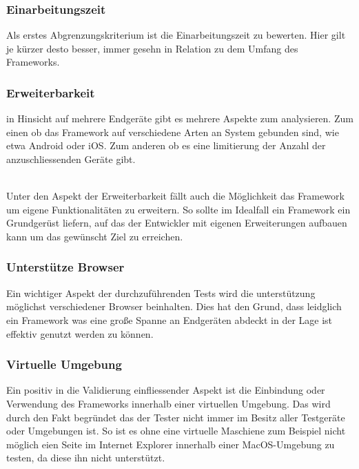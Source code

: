 	\subsubsection{Einarbeitungszeit}
	Als erstes Abgrenzungskriterium ist die Einarbeitungszeit zu bewerten. Hier gilt je kürzer desto besser, immer gesehn in Relation 	zu dem Umfang des Frameworks. 
	
	 \subsubsection{Erweiterbarkeit}
	 in Hinsicht auf mehrere Endgeräte gibt es mehrere Aspekte zum analysieren. Zum einen ob das Framework auf verschiedene 	Arten an System gebunden sind, wie etwa Android oder iOS. Zum anderen ob es eine limitierung der Anzahl der 				anzuschliessenden Geräte gibt. 

	\\Unter den Aspekt der Erweiterbarkeit fällt auch die Möglichkeit das Framework um eigene Funktionalitäten zu erweitern. So 		sollte im Idealfall ein Framework ein Grundgerüst liefern, auf das der Entwickler mit eigenen Erweiterungen aufbauen kann um 	das gewünscht Ziel zu erreichen.

	\subsubsection{Unterstütze Browser}
	Ein wichtiger Aspekt der durchzuführenden Tests wird die unterstützung möglichst verschiedener Browser beinhalten. Dies hat 	den Grund, dass leidglich ein Framework was eine große Spanne an Endgeräten abdeckt in der Lage ist effektiv genutzt werden 	zu können.

	\subsubsection{Virtuelle Umgebung}
	Ein positiv in die Validierung einfliessender Aspekt ist die Einbindung oder Verwendung des Frameworks innerhalb einer 			virtuellen Umgebung. Das wird durch den Fakt begründet das der Tester nicht immer im Besitz aller Testgeräte oder 				Umgebungen ist. So ist es ohne eine virtuelle Maschiene zum Beispiel nicht möglich eien Seite im Internet Explorer innerhalb 		einer MacOS-Umgebung zu testen, da diese ihn nicht unterstützt.

